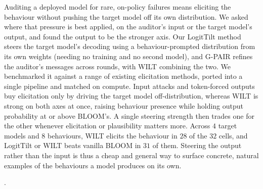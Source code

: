 \documentclass{article}
\theoremstyle{plain}
\theoremstyle{definition}
\theoremstyle{remark}
\begin{document}
Auditing a deployed model for rare, on-policy failures means eliciting the behaviour without pushing the target model off its own distribution. We asked where that pressure is best applied, on the auditor's input or the target model's output, and found the output to be the stronger axis. Our LogitTilt method steers the target model's decoding using a behaviour-prompted distribution from its own weights (needing no training and no second model), and G-PAIR refines the auditor's messages across rounds, with WILT combining the two. We benchmarked it against a range of existing elicitation methods, ported into a single pipeline and matched on compute. Input attacks and token-forced outputs buy elicitation only by driving the target model off-distribution, whereas WILT is strong on both axes at once, raising behaviour presence while holding output probability at or above BLOOM's. A single steering strength then trades one for the other whenever elicitation or plausibility matters more. Across $4$ target models and $8$ behaviours, WILT elicits the behaviour in $28$ of the $32$ cells, and LogitTilt or WILT beats vanilla BLOOM in $31$ of them. Steering the output rather than the input is thus a cheap and general way to surface concrete, natural examples of the behaviours a model produces on its own.









\newpage
.
\newpage



\newpage
\appendix
\onecolumn
\makeatletter
\let\ORG@section\section
\renewcommand\section{\FloatBarrier\ORG@section}
\makeatother
\end{document}
